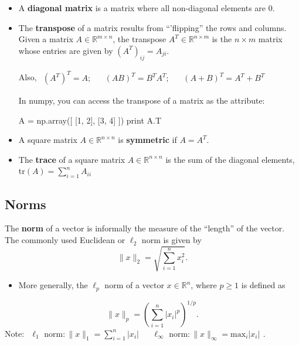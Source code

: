 \begin{itemize}
\item A {\bf diagonal matrix} is a matrix where all non-diagonal elements are $0$.


\item The {\bf transpose} of a matrix results from ``'flipping'' the rows and columns. 
Given a matrix $A \in \mathbb{R}^{m\times n}$, the transpose $A^{T} \in \mathbb{R}^{n\times m}$
is the $n \times m$ matrix whose entries are given by $(A^{T})_{ij}= A_{ji}$.

Also, $\begin{array}{ccccc}(A^{T})^{T}= A; &  & (AB)^{T}=B^{T}A^{T}; & & (A+B)^{T}= A^{T}+B^{T} \end{array}$

In numpy, you can access the transpose of a matrix as the  attribute:

\begin{python}
A = np.array([ [1, 2], [3, 4] ])
print A.T
\end{python}

\item A square matrix $A \in \mathbb{R}^{n\times n}$ is {\bf symmetric} if  $A=A^{T}$.

\item The {\bf trace} of a square matrix $A \in \mathbb{R}^{n\times n}$ is the sum of the diagonal
elements, tr$(A)= \sum\limits_{i=1}^{n} A_{ii}$

\end{itemize}
\subsection{Norms}
The {\bf norm} of a vector is informally the measure of the ``length'' of the vector. The commonly
used Euclidean or $\ell_{2}$ norm is given by
\begin{equation*}
\|x\|_{2}=\sqrt{\sum\limits_{i=1}^{n} x_{i}^{2}}.
\end{equation*}

\begin{itemize}
\item More generally, the $\ell_{p}$ norm of a vector $x \in \mathbb{R}^{n}$, where $p \geq 1$ is defined as 
\end{itemize}
\begin{equation*}
\|x\|_{p}=\left(\sum\limits_{i=1}^{n}|x_{i}|^{p}\right)^{1/p}.
\end{equation*}
Note: $\begin{array}{ccc} \ell_{1} \text{ norm}: \|x\|_{1} = \sum\limits_{i=1}^{n} |x_{i}| && \ell_{\infty} \text{ norm}: \|x\|_{\infty} = \text{max}_{i} |x_{i}| \end{array}$.

